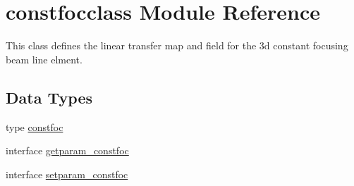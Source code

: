 \hypertarget{namespaceconstfocclass}{}\section{constfocclass Module Reference}
\label{namespaceconstfocclass}


This class defines the linear transfer map and field for the 3d constant focusing beam line elment.  


\subsection*{Data Types}
\begin{DoxyCompactItemize}
\item 
type \mbox{\hyperlink{namespaceconstfocclass_structconstfocclass_1_1constfoc}{constfoc}}
\item 
interface \mbox{\hyperlink{interfaceconstfocclass_1_1getparam__constfoc}{getparam\+\_\+constfoc}}
\item 
interface \mbox{\hyperlink{interfaceconstfocclass_1_1setparam__constfoc}{setparam\+\_\+constfoc}}
\end{DoxyCompactItemize}
